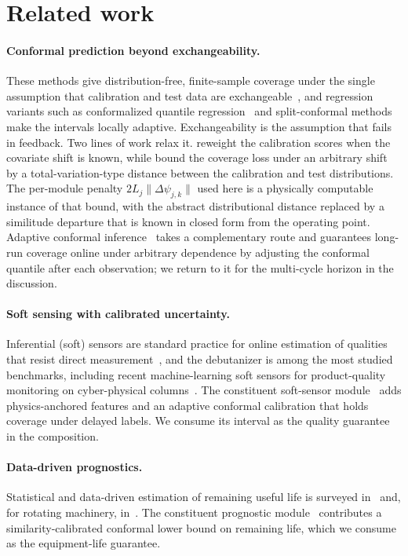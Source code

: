 \section{Related work}
\label{sec:related}

\paragraph{Conformal prediction beyond exchangeability.}
These methods give distribution-free, finite-sample coverage under the single
assumption that calibration and test data are exchangeable~\citep{vovk2005,shafer2008,
angelopoulos2023}, and regression variants such as conformalized quantile
regression~\citep{romano2019} and split-conformal methods~\citep{lei2018} make the
intervals locally adaptive. Exchangeability is the assumption that fails in feedback.
Two lines of work relax it. \citet{tibshirani2019} reweight the calibration scores when
the covariate shift is known, while \citet{barber2023} bound the coverage loss under an
arbitrary shift by a total-variation-type distance between the calibration and test
distributions. The per-module penalty $2L_j\|\Delta\psi_{j,k}\|$ used here is a
physically computable instance of that bound, with the abstract distributional distance
replaced by a similitude departure that is known in closed form from the operating
point. Adaptive conformal inference~\citep{gibbs2021} takes a complementary route and
guarantees long-run coverage online under arbitrary dependence by adjusting the
conformal quantile after each observation; we return to it for the multi-cycle horizon
in the discussion.

\paragraph{Soft sensing with calibrated uncertainty.}
Inferential (soft) sensors are standard practice for online estimation of qualities
that resist direct measurement~\citep{fortuna2007}, and the debutanizer is among the
most studied benchmarks, including recent machine-learning soft sensors for
product-quality monitoring on cyber-physical columns~\citep{rozanec2022}. The
constituent soft-sensor module~\citep{busico_m1} adds physics-anchored features and an
adaptive conformal calibration that holds coverage under delayed labels. We consume its
interval as the quality guarantee in the composition.

\paragraph{Data-driven prognostics.}
Statistical and data-driven estimation of remaining useful life is surveyed
in~\citet{si2011} and, for rotating machinery, in~\citet{lei2018machinery}. The
constituent prognostic module~\citep{busico_m2} contributes a similarity-calibrated
conformal lower bound on remaining life, which we consume as the equipment-life
guarantee.

